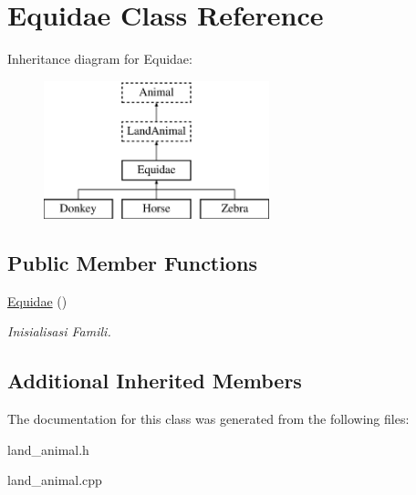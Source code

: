 \hypertarget{class_equidae}{}\section{Equidae Class Reference}
\label{class_equidae}
Inheritance diagram for Equidae\+:\begin{figure}[H]
\begin{center}
\leavevmode
\includegraphics[height=4.000000cm]{class_equidae}
\end{center}
\end{figure}
\subsection*{Public Member Functions}
\begin{DoxyCompactItemize}
\item 
\hyperlink{class_equidae_a867c943c77cd72bc26442c14369ce3cc}{Equidae} ()\hypertarget{class_equidae_a867c943c77cd72bc26442c14369ce3cc}{}\label{class_equidae_a867c943c77cd72bc26442c14369ce3cc}

\begin{DoxyCompactList}\small\item\em Inisialisasi Famili. \end{DoxyCompactList}\end{DoxyCompactItemize}
\subsection*{Additional Inherited Members}


The documentation for this class was generated from the following files\+:\begin{DoxyCompactItemize}
\item 
land\+\_\+animal.\+h\item 
land\+\_\+animal.\+cpp\end{DoxyCompactItemize}
